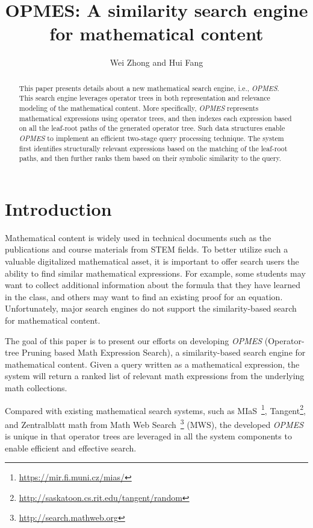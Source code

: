 \documentclass{llncs}
\begin{document}
\title{OPMES: A similarity search engine for mathematical content}
\author{Wei Zhong and Hui Fang}
\maketitle
%
\begin{abstract}
This paper presents details about a new mathematical search engine, 
i.e., {\em OPMES}. This search engine leverages operator trees 
in both representation and relevance modeling of the mathematical 
content. More specifically, {\em OPMES} represents
mathematical expressions using operator trees, and then 
indexes each expression based on all the leaf-root paths of the generated
operator tree.  Such data structures enable {\em OPMES} to implement an 
efficient two-stage query processing technique. The system first 
identifies structurally relevant expressions based on the matching of the 
leaf-root paths, and then further ranks them based on their symbolic
similarity to the query. 
\end{abstract}

\section{Introduction}

Mathematical content is widely used in technical documents such as 
the publications and course materials from STEM fields. 
To better utilize such a valuable digitalized mathematical asset, 
it is important to offer search users the ability to find similar 
mathematical expressions. For example, some students may want to collect
additional information about the formula that they have learned in 
the class, and others may want to find an existing proof for an equation. 
Unfortunately, major search engines do not support the similarity-based
search for mathematical content.  

The goal of this paper is to present our efforts on developing 
{\em OPMES} (Operator-tree Pruning based Math Expression Search), 
a similarity-based search engine for mathematical content. 
Given a query written as a mathematical expression, 
the system will return a ranked list of relevant math expressions 
from the underlying math collections. 

Compared with existing mathematical search systems, such as 
MIaS~\footnote{\url{https://mir.fi.muni.cz/mias/}}, 
Tangent\footnote{\url{http://saskatoon.cs.rit.edu/tangent/random}},
and Zentralblatt math from Math Web Search~\footnote{\url{http://search.mathweb.org}} (MWS), 
the developed {\em OPMES} is unique in that operator trees
\cite{goodsurvey} are 
leveraged in all the system components to enable efficient 
and effective search. 
\end{document}
